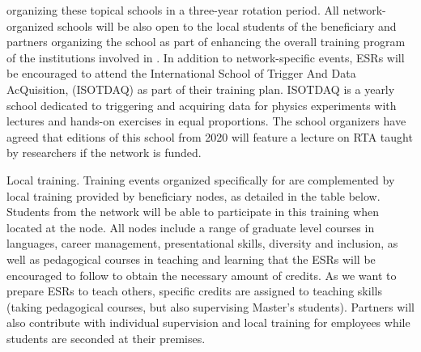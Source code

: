organizing these topical schools in a three-year rotation period. All network-organized
schools will be also open to the local students of the beneficiary and partners organizing the school
as part of enhancing the overall training program of the institutions involved in \acronym. 
In addition to network-specific events, ESRs will be encouraged
to attend the International School of Trigger And Data AcQuisition, (ISOTDAQ) as part of their training plan. 
ISOTDAQ is a yearly school dedicated to triggering and acquiring data for physics experiments
with lectures and hands-on exercises in equal proportions. The school organizers
have agreed that editions of this school from 2020 will feature a lecture on RTA taught by \acronym researchers if the network is funded. 

\noindent \color{blue}Local training. \color{black}
Training events organized specifically for \acronym are complemented
by local training provided by beneficiary nodes, as detailed in the table below. Students from the
network will be able to participate in this training when located at the node. 
All nodes include a range of graduate level courses in languages, career management, presentational skills, diversity and inclusion, as 
well as pedagogical courses in teaching and learning that the ESRs will be encouraged to follow
to obtain the necessary amount of credits. As we want to prepare ESRs to teach others, specific 
credits are assigned to teaching skills (taking pedagogical courses, but also supervising Master's students). 
Partners will also contribute with 
individual supervision and local training for employees while students
are seconded at their premises. 

